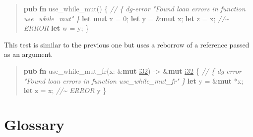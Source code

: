 \documentclass[
  11pt,
  twoside,symmetric]{report}
\newenvironment{Shaded}{}{}
\newcommand{\CommentTok}[1]{\textit{#1}}
\newcommand{\DataTypeTok}[1]{\underline{#1}}
\newcommand{\DecValTok}[1]{#1}
\newcommand{\KeywordTok}[1]{\textbf{#1}}
\newcommand{\NormalTok}[1]{#1}
\newcommand{\OperatorTok}[1]{#1}
\begin{document}
\begin{quote}
\begin{Shaded}
\begin{Highlighting}[]
\KeywordTok{pub} \KeywordTok{fn}\NormalTok{ use\_while\_mut() }\OperatorTok{\{}
    \CommentTok{// \{ dg{-}error "Found loan errors in function use\_while\_mut" \}}
    \KeywordTok{let} \KeywordTok{mut}\NormalTok{ x }\OperatorTok{=} \DecValTok{0}\OperatorTok{;}
    \KeywordTok{let}\NormalTok{ y }\OperatorTok{=} \OperatorTok{\&}\KeywordTok{mut}\NormalTok{ x}\OperatorTok{;}
    \KeywordTok{let}\NormalTok{ z }\OperatorTok{=}\NormalTok{ x}\OperatorTok{;} \CommentTok{//\textasciitilde{} ERROR}
    \KeywordTok{let}\NormalTok{ w }\OperatorTok{=}\NormalTok{ y}\OperatorTok{;}
\OperatorTok{\}}
\end{Highlighting}
\end{Shaded}
\end{quote}

This test is similar to the previous one but uses a reborrow of a
reference passed as an argument.

\begin{quote}
\begin{Shaded}
\begin{Highlighting}[]
\KeywordTok{pub} \KeywordTok{fn}\NormalTok{ use\_while\_mut\_fr(x}\OperatorTok{:} \OperatorTok{\&}\KeywordTok{mut} \DataTypeTok{i32}\NormalTok{) }\OperatorTok{{-}\textgreater{}} \OperatorTok{\&}\KeywordTok{mut} \DataTypeTok{i32} \OperatorTok{\{} 
    \CommentTok{// \{ dg{-}error "Found loan errors in function use\_while\_mut\_fr" \}}
    \KeywordTok{let}\NormalTok{ y }\OperatorTok{=} \OperatorTok{\&}\KeywordTok{mut} \OperatorTok{*}\NormalTok{x}\OperatorTok{;}
    \KeywordTok{let}\NormalTok{ z }\OperatorTok{=}\NormalTok{ x}\OperatorTok{;} \CommentTok{//\textasciitilde{} ERROR}
\NormalTok{    y}
\OperatorTok{\}}
\end{Highlighting}
\end{Shaded}
\end{quote}

\chapter{Glossary}\label{sec:glossary}
\end{document}
